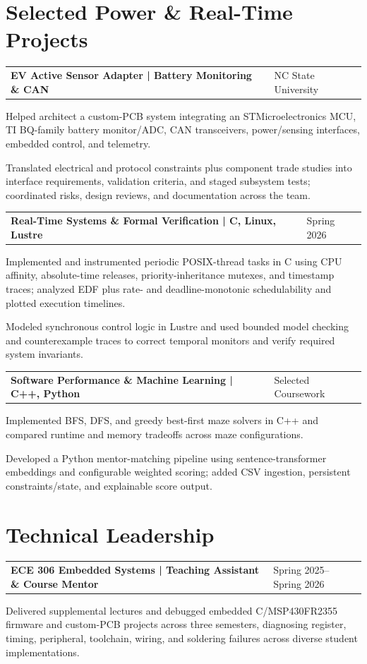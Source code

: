 \documentclass[10pt,letterpaper]{article}
\makeatletter
\newcommand{\resumeentry}[2]{%
  \begin{tabularx}{\textwidth}{@{}X>{\raggedleft\arraybackslash}p{2.40in}@{}}
    \textbf{#1} & #2
  \end{tabularx}\vspace{-0.075cm}
}
\makeatother
\begin{document}
\section{Selected Power \& Real-Time Projects}
\resumeentry{EV Active Sensor Adapter | Battery Monitoring \& CAN}{NC State University}
\begin{resumebullets}
  \item Helped architect a custom-PCB system integrating an STMicroelectronics MCU, TI BQ-family battery monitor/ADC, CAN transceivers, power/sensing interfaces, embedded control, and telemetry.
  \item Translated electrical and protocol constraints plus component trade studies into interface requirements, validation criteria, and staged subsystem tests; coordinated risks, design reviews, and documentation across the team.
\end{resumebullets}

\resumeentry{Real-Time Systems \& Formal Verification | C, Linux, Lustre}{Spring 2026}
\begin{resumebullets}
  \item Implemented and instrumented periodic POSIX-thread tasks in C using CPU affinity, absolute-time releases, priority-inheritance mutexes, and timestamp traces; analyzed EDF plus rate- and deadline-monotonic schedulability and plotted execution timelines.
  \item Modeled synchronous control logic in Lustre and used bounded model checking and counterexample traces to correct temporal monitors and verify required system invariants.
\end{resumebullets}

\resumeentry{Software Performance \& Machine Learning | C++, Python}{Selected Coursework}
\begin{resumebullets}
  \item Implemented BFS, DFS, and greedy best-first maze solvers in C++ and compared runtime and memory tradeoffs across maze configurations.
  \item Developed a Python mentor-matching pipeline using sentence-transformer embeddings and configurable weighted scoring; added CSV ingestion, persistent constraints/state, and explainable score output.
\end{resumebullets}

\section{Technical Leadership}
\resumeentry{ECE 306 Embedded Systems | Teaching Assistant \& Course Mentor}{Spring 2025--Spring 2026}
\begin{resumebullets}
  \item Delivered supplemental lectures and debugged embedded C/MSP430FR2355 firmware and custom-PCB projects across three semesters, diagnosing register, timing, peripheral, toolchain, wiring, and soldering failures across diverse student implementations.
\end{resumebullets}
\end{document}

